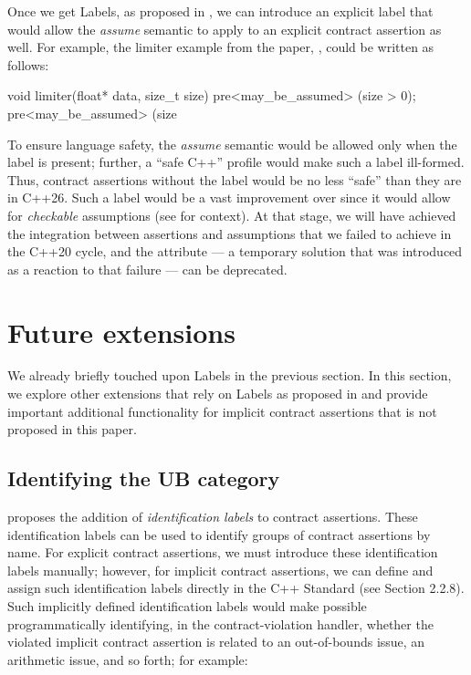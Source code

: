 Once we get Labels, as proposed in \cite{P3400R1}, we can introduce an explicit label that would allow the \emph{assume} semantic to apply to an explicit contract assertion as well. For example, the limiter example from the \tcode{[[assume]]} paper, \cite{P1774R8}, could be written as follows:
\begin{codeblock}
void limiter(float* data, size_t size)
  pre<may_be_assumed> (size > 0);
  pre<may_be_assumed> (size %
\end{codeblock}
To ensure language safety, the \emph{assume} semantic would be allowed only when the \mbox{} label is present; further, a ``safe C++'' profile would make such a label ill-formed. Thus, contract assertions without the label would be no less ``safe'' than they are in C++26. Such a label would be a vast improvement over \tcode{[[assume]]} since it would allow for \emph{checkable} assumptions (see \cite{P2064R0} for context). At that stage, we will have achieved the integration between assertions and assumptions that we failed to achieve in the C++20 cycle, and the \tcode{[[assume]]} attribute --- a temporary solution that was introduced as a reaction to that failure --- can be deprecated.

\section{Future extensions}
\label{ext}

We already briefly touched upon Labels in the previous section. In this section, we explore other exten\-sions that rely on Labels as proposed in \cite{P3400R1} and provide important additional functionality for implicit contract assertions that is not proposed in this paper.

\subsection{Identifying the UB category}
\label{idlabels}

\cite{P3400R1} proposes the addition of \emph{identification labels} to contract assertions. These identification labels can be used to identify groups of contract assertions by name. For explicit contract assertions, we must introduce these identification labels manually; however, for implicit contract assertions, we can define and assign such identification labels directly in the C++ Standard (see \cite{P3400R1} Section 2.2.8). Such implicitly defined identification labels would make possible programmatically identifying, in the contract-violation handler, whether the violated implicit contract assertion  is related to an out-of-bounds issue, an arithmetic issue, and so forth; for example:

